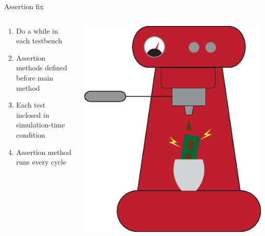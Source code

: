 \documentclass[aspectratio=169, handout]{beamer}
\begin{document}
\begin{frame}{Assertion fix}
    \begin{columns}[c]
        \begin{column}{.3\textwidth}
            \begin{enumerate}
                \item Do a while in each testbench
                \item Assertion methods defined before main method
                \item Each test inclosed in simulation-time condition
                \item Assertion method runs every cycle
            \end{enumerate}
        \end{column}
        \begin{column}{.5\textwidth}
            \includegraphics[width=.8\columnwidth]{graphics/steelbrew.eps}
        \end{column}
    \end{columns}
\end{frame}
\end{document}
